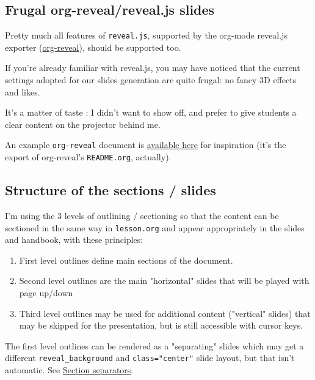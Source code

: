 \documentclass[a4paper]{article}
\newenvironment{NOTES}{\begin{lrbox}{\mybox}\begin{minipage}{0.9\textwidth}\begin{shaded}}{\end{shaded}\end{minipage}\end{lrbox}\fbox{\usebox{\mybox}}}
\begin{document}
\subsection{Frugal org-reveal/reveal.js slides}
\label{sec:org2254bb8}

Pretty much all features of \texttt{reveal.js}, supported by the org-mode reveal.js exporter (\href{https://github.com/yjwen/org-reveal/}{org-reveal}), should be supported too.

If you're already familiar with reveal.js, you may have noticed that
the current settings adopted for our slides generation are quite
frugal: no fancy 3D effects and likes.


\begin{NOTES}
It's a matter of taste : I didn't want to show off, and prefer to give
students a clear content on the projector behind me.

An example \texttt{org-reveal} document is \href{elisp/org-reveal/Readme.html}{available here} for inspiration (it's the export of org-reveal's \texttt{README.org}, actually).
\end{NOTES}

\subsection{Structure of the sections / slides}
\label{sec:orgaea2ff1}

I'm using the 3 levels of outlining / sectioning so that the content can be sectioned in the same way in \texttt{lesson.org} and appear appropriately in the slides and handbook, with these principles:

\begin{enumerate}
\item First level outlines define main sections of the document.
\item Second level outlines are the main "horizontal" slides that will be played with page up/down
\item Third level outlines may be used for additional content ("vertical" slides) that may be skipped for the presentation, but is still accessible with cursor keys.
\end{enumerate}

\begin{NOTES}
The first level outlines can be rendered as a "separating" slides which may get a different \texttt{reveal\_background} and \texttt{class="center"} slide layout, but that isn't automatic. See \hyperref[sec:org468ee93]{Section separators}.
\end{NOTES}
\end{document}
